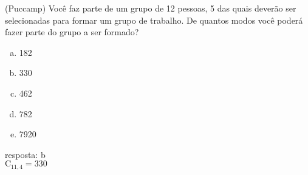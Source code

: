 \begin{ex}
 (Puccamp) Você faz parte de um grupo de 12 pessoas, 5 das quais deverão ser selecionadas para formar um grupo de trabalho. De quantos modos você poderá fazer parte do grupo a ser formado?
    \begin{enumerate}[(a)]
    \item 182
    \item 330
    \item 462
    \item 782
    \item 7920
    \end{enumerate}
      \begin{sol}
       resposta: b \\
       $\mathrm{C}_{{11},4}= 330$
      \end{sol}
\end{ex}